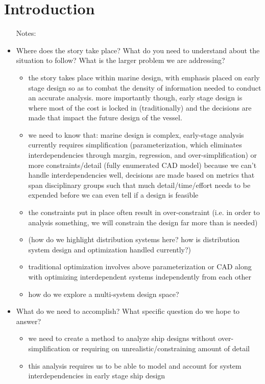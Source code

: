 \documentclass[preprint,12pt]{elsarticle}
\begin{document}
\section{Introduction} \label{sec:intro}
\begin{itemize}
	\item[Notes:]
	\item Where does the story take place? What do you need to understand about the situation to follow? What is the larger problem we are addressing?
	\begin{itemize}
		\item the story takes place within marine design, with emphasis placed on early stage design so as to combat the density of information needed to conduct an accurate analysis. more importantly though, early stage design is where most of the cost is locked in (traditionally) and the decisions are made that impact the future design of the vessel.
		\item we need to know that: marine design is complex, early-stage analysis currently requires simplification (parameterization, which eliminates interdependencies through margin, regression, and over-simplification) or more constraints/detail (fully enumerated CAD model) because we can't handle interdependencies well, decisions are made based on metrics that span disciplinary groups such that much detail/time/effort needs to be expended before we can even tell if a design is feasible
		\item the constraints put in place often result in over-constraint (i.e. in order to analysis something, we will constrain the design far more than is needed)
		\item (how do we highlight distribution systems here? how is distribution system design and optimization handled currently?)
		\item traditional optimization involves above parameterization or CAD along with optimizing interdependent systems independently from each other
		\item how do we explore a multi-system design space?
	\end{itemize}
	\item What do we need to accomplish? What specific question do we hope to answer?
	\begin{itemize}
		\item we need to create a method to analyze ship designs without over-simplification or requiring on unrealistic/constraining amount of detail
		\item this analysis requires us to be able to model and account for system interdependencies in early stage ship design

\end{itemize}
\end{itemize}
\end{document}
